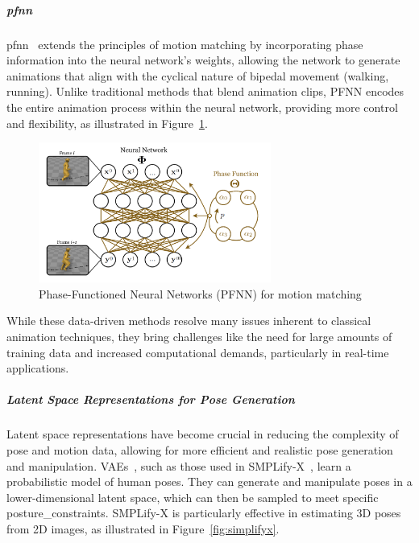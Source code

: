 \documentclass[../../main.tex]{subfiles}
\begin{document}
\subparagraph{\gls{pfnn}}
\label{ch:background_work:sign_language_synthesis:3d_techniques:avatar_animation:deep_learning:pfnn}

\gls{pfnn}~\cite{10.1145/3072959.3073663} extends the principles of motion matching by incorporating phase information into the neural network’s weights, allowing the network to generate animations that align with the cyclical nature of bipedal movement (walking, running). Unlike traditional methods that blend animation clips, PFNN encodes the entire animation process within the neural network, providing more control and flexibility, as illustrated in Figure~\ref{fig:pfnn}.

\begin{figure}
  \centering \includegraphics[width = 3in]{chapters/background_work/images/pfnn.png}
  \caption{Phase-Functioned Neural Networks (PFNN) for motion matching}
  \label{fig:pfnn}
\end{figure}

While these data-driven methods resolve many issues inherent to classical animation techniques, they bring challenges like the need for large amounts of training data and increased computational demands, particularly in real-time applications.

\subparagraph{Latent Space Representations for Pose Generation}
\label{ch:background_work:sign_language_synthesis:3d_techniques:avatar_animation:deep_learning:latent_space}

Latent space representations have become crucial in reducing the complexity of pose and motion data, allowing for more efficient and realistic pose generation and manipulation. VAEs~\cite{kingma2013auto}, such as those used in SMPLify-X~\cite{pavlakos2019expressive}, learn a probabilistic model of human poses. They can generate and manipulate poses in a lower-dimensional latent space, which can then be sampled to meet specific \gls{posture_constraint}s. SMPLify-X is particularly effective in estimating 3D poses from 2D images, as illustrated in Figure~\ref{fig:simplifyx}.
\end{document}
